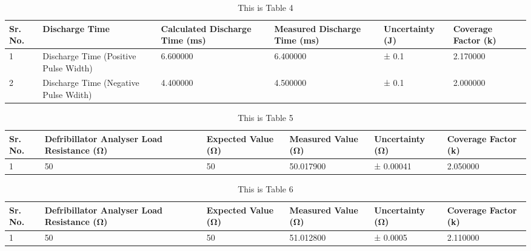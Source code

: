 \begin{table}
\caption{This is Table 4}
\begin{tabularx}{\textwidth}{|X|X|X|X|X|X|}

Sr. No. & Discharge Time & Calculated Discharge Time (ms) & Measured Discharge Time (ms) & Uncertainty (J) & Coverage Factor (k) \\ \hline

1 & Discharge Time (Positive Pulse Width) & 6.600000 & 6.400000 & ± 0.1 & 2.170000 \\ \hline
2 & Discharge Time (Negative Pulse Wdith) & 4.400000 & 4.500000 & ± 0.1 & 2.000000 \\ \hline

\end{tabularx}
\end{table}
\begin{table}
\caption{This is Table 5}
\begin{tabularx}{\textwidth}{|X|X|X|X|X|X|}

Sr. No. & Defribillator Analyser Load Resistance (Ω) & Expected Value (Ω) & Measured Value (Ω) & Uncertainty (Ω) & Coverage Factor (k) \\ \hline

1 & 50 & 50 & 50.017900 &  ± 0.00041 & 2.050000 \\ \hline

\end{tabularx}
\end{table}
\begin{table}
\caption{This is Table 6}
\begin{tabularx}{\textwidth}{|X|X|X|X|X|X|}

Sr. No. & Defribillator Analyser Load Resistance (Ω) & Expected Value (Ω) & Measured Value (Ω) & Uncertainty (Ω) & Coverage Factor (k) \\ \hline

1 & 50 & 50 & 51.012800 &  ± 0.0005 & 2.110000 \\ \hline

\end{tabularx}
\end{table}
